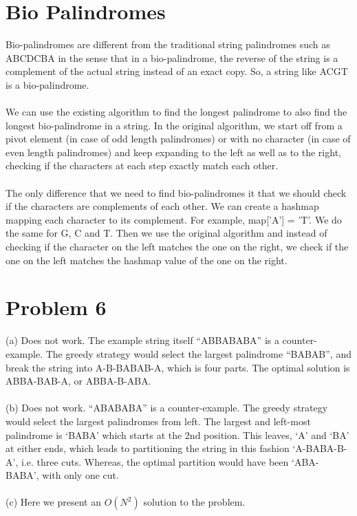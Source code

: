 \documentclass{article}
\begin{document}
\section{Bio Palindromes}
Bio-palindromes are different from the traditional string palindromes such as ABCDCBA in the sense that in a bio-palindrome, the reverse of the string is a complement of the actual string instead of an exact copy. So, a string like ACGT is a bio-palindrome. \\
\\
We can use the existing algorithm to find the longest palindrome to also find the longest bio-palindrome in a string. In the original algorithm, we start off from a pivot element (in case of odd length palindromes) or with no character (in case of even length palindromes) and keep expanding to the left as well as to the right, checking if the characters at each step exactly match each other. \\
\\
The only difference that we need to find bio-palindromes it that we should check if the characters are complements of each other. We can create a hashmap mapping each character to its complement. For example, map['A'] = 'T'. We do the same for G, C and T. Then we use the original algorithm and instead of checking if the character on the left matches the one on the right, we check if the one on the left matches the hashmap value of the one on the right. 
\clearpage

\section{Problem 6}
(a) Does not work. The example string itself “ABBABABA” is a 
counter-example. The greedy strategy would select the largest 
palindrome “BABAB”, and break the string into A-B-BABAB-A, 
which is four parts. The optimal solution is ABBA-BAB-A, or ABBA-B-ABA.\\
\\
(b) Does not work. “ABABABA” is a counter-example. The greedy strategy 
would select the largest palindromes from left. The largest and left-most
palindrome is `BABA' which starts at the 2nd position. This leaves, `A' and
`BA' at either ends, which leads to partitioning the string in this fashion
`A-BABA-B-A', i.e. three cuts. Whereas, the optimal partition would have
been `ABA-BABA', with only one cut.\\
\\
(c) Here we present an $O(N^2)$ solution to the problem. \\
\end{document}
